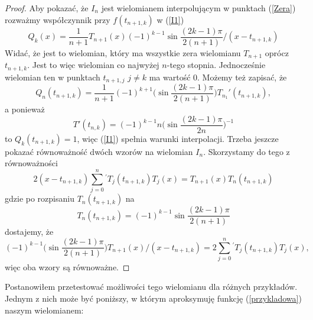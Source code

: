 \documentclass[11pt,wide]{mwart}
\begin{document}
\begin{proof} \cite{i3}
Aby pokazać, że $I_n$ jest wielomianem interpolującym w punktach (\ref{Zera}) rozważmy współczynnik przy $f(t_{n+1,k})$ w (\ref{I1})
\begin{equation}
Q_k(x) = \frac{1}{n+1} T_{n+1}(x) (-1)^{k-1} \sin \frac{(2k-1)\pi}{2(n+1)} / (x - t_{n+1,k})
\end{equation}
Widać, że jest to wielomian, który ma wszystkie zera wielomianu $T_{n+1}$ oprócz $t_{n+1, k}$. Jest to więc wielomian co najwyżej $n$-tego stopnia. Jednocześnie wielomian ten w punktach $t_{n+1, j}$ $j \neq k$ ma wartość $0$.
Możemy też zapisać, że 
\begin{equation}
Q_n(t_{n+1, k}) = \frac{1}{n+1} (-1)^{k+1} \Big( \sin \frac{(2k-1)\pi}{2(n+1)} \Big) T_{n_1}'(t_{n+1,k}),
\end{equation}
a ponieważ
\begin{equation}
T'(t_{n,k}) = (-1)^{k-1} n \Big( \sin \frac{(2k-1)\pi}{2n} \Big)^{-1}
\end{equation}
to $Q_k(t_{n+1, k}) = 1$, więc (\ref{I1}) spełnia warunki interpolacji. Trzeba jeszcze pokazać równoważność dwóch wzorów na wielomian $I_n$. Skorzystamy do tego z równoważności
\begin{equation}
2(x - t_{n+1, k}) \sum_{j=0}^n {}^{'} T_j(t_{n+1, k}) T_j(x) = T_{n+1}(x)T_n(t_{n+1, k})
\end{equation}
gdzie po rozpisaniu $T_n(t_{n+1, k})$ na
\begin{equation}
T_n(t_{n+1, k}) = (-1)^{k-1} \sin \frac{(2k - 1) \pi}{2(n+1)}
\end{equation}
dostajemy, że
\begin{equation}
(-1)^{k-1} \Big( \sin \frac{(2k - 1) \pi}{2(n+1)} \Big) T_{n+1}(x) / (x-t_{n+1, k}) = 2 \sum_{j = 0}^n {}^{'} T_j(t_{n+1, k})T_j(x), 
\end{equation}
więc oba wzory są równoważne.
\end{proof} 
Postanowiłem przetestować możliwości tego wielomianu dla różnych przykładów.
Jednym z nich może być poniższy, w którym aproksymuję funkcję (\ref{przykladowa}) naszym wielomianem: \\ 
\end{document}
